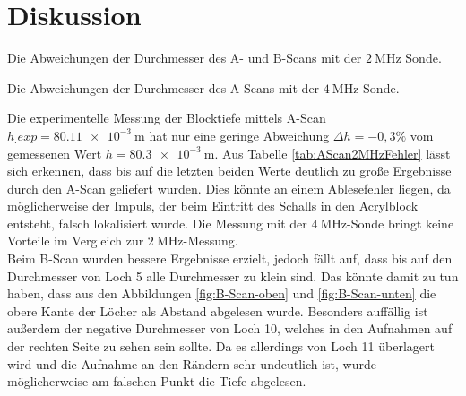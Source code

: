 
\section{Diskussion}
\label{sec:Diskussion}

\begin{table}
	\centering
	\caption{Die Abweichungen der Durchmesser des A- und B-Scans mit der $\SI{2}{\mega\hertz}$ Sonde.}
	
	\label{tab:AScan2MHzFehler}
\end{table}

\begin{table}
	\centering
	\caption{Die Abweichungen der Durchmesser des A-Scans mit der $\SI{4}{\mega\hertz}$ Sonde.}
	
	\label{tab:AScan4MHzFehler}
\end{table}

\noindent Die experimentelle Messung der Blocktiefe mittels A-Scan $h_.{exp}=\SI{80.11e-3}{\metre}$ hat nur eine geringe Abweichung $\Delta h = -0,3 \%$ vom gemessenen Wert $h=\SI{80.3e-3}{\metre}$.
Aus Tabelle \ref{tab:AScan2MHzFehler} lässt sich erkennen, dass bis auf die letzten beiden Werte deutlich zu große Ergebnisse durch den A-Scan geliefert wurden. Dies könnte an einem Ablesefehler liegen, da möglicherweise der Impuls, der beim Eintritt des Schalls in den Acrylblock entsteht, falsch lokalisiert wurde. 
Die Messung mit der $\SI{4}{\mega\hertz}$-Sonde bringt keine Vorteile im Vergleich zur
$\SI{2}{\mega\hertz}$-Messung.\\
Beim B-Scan wurden bessere Ergebnisse erzielt, jedoch fällt auf, dass bis auf den Durchmesser von Loch 5 alle Durchmesser zu klein sind. Das könnte damit zu tun haben, dass aus den Abbildungen \ref{fig:B-Scan-oben} und \ref{fig:B-Scan-unten} die obere Kante der Löcher als Abstand abgelesen wurde. Besonders auffällig ist außerdem der negative Durchmesser von Loch 10, welches in den Aufnahmen auf der rechten Seite zu sehen sein sollte. Da es allerdings von Loch 11 überlagert wird und die Aufnahme an den Rändern sehr undeutlich ist, wurde möglicherweise am falschen Punkt die Tiefe abgelesen.\\

